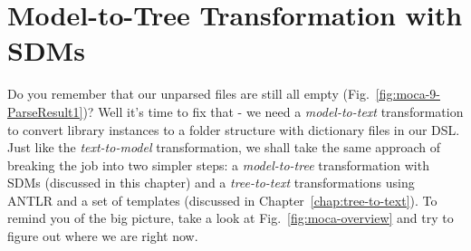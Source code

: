 \section{Model-to-Tree Transformation with SDMs}
\label{chap:model-to-tree}
Do you remember that our unparsed files are still all empty (Fig.~\ref{fig:moca-9-ParseResult1})?
Well it's time to fix that - we need a \emph{model-to-text} transformation to convert library instances to a folder structure with dictionary files in our DSL.
Just like the \emph{text-to-model} transformation, we shall take the same approach of breaking the job into two simpler steps:  a \emph{model-to-tree} transformation  with SDMs (discussed in this chapter) and a \emph{tree-to-text} transformations using ANTLR and a set of templates (discussed in Chapter~\ref{chap:tree-to-text}).
To remind you of the big picture, take a look at Fig.~\ref{fig:moca-overview} and try to figure out where we are right now.

